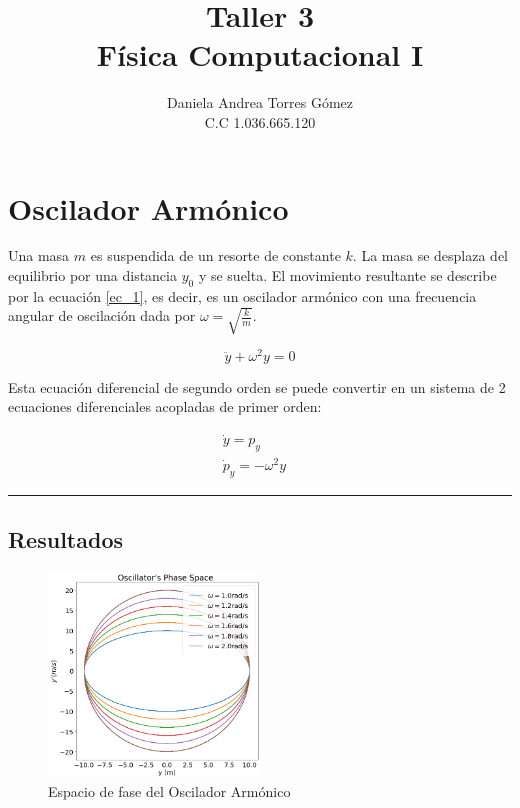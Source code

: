 \documentclass[a4paper]{article}
\title{Taller 3\\ Física Computacional I}
\author{Daniela Andrea Torres Gómez\\ C.C 1.036.665.120

}
\date{}
\theoremstyle{definition}
\theoremstyle{plain}
\begin{document}
\maketitle



\section*{Oscilador Armónico}



Una masa $m$ es suspendida de un resorte de constante $k$. La masa se desplaza del equilibrio por una distancia $y_0$ y se suelta. El movimiento resultante se describe por la ecuación \ref{ec_1}, es decir, es un oscilador armónico con una frecuencia angular de oscilación dada por $\omega = \sqrt{\frac{k}{m}}$. 

\begin{equation}
 \ddot{y} + \omega^2 y = 0
 \label{ec_1}
\end{equation}

Esta ecuación diferencial de segundo orden se puede convertir en un sistema de 2 ecuaciones diferenciales acopladas de primer orden:

\begin{align*}
 \dot y = p_y & \\
 \dot p_y = -\omega^2 y
\end{align*}

\rule{145 mm}{0.1 mm}



\subsection{Resultados}



\begin{figure}[H]
\begin {center}
\includegraphics[width=0.5\textwidth]{output_2_3.png}
\caption{Espacio de fase del Oscilador Armónico}
\label{fig:PhaseH}
\end {center}
\end{figure}
\end{document}
